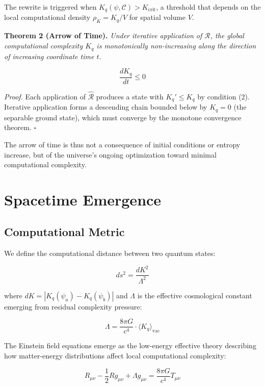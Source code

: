 \documentclass[12pt,a4paper]{article}
\begin{document}
The rewrite is triggered when $K_q(\psi, \mathcal{C}) > K_{\text{crit}}$, a threshold that depends on the local computational density $\rho_K = K_q / V$ for spatial volume $V$.

\textbf{Theorem 2 (Arrow of Time).} \textit{Under iterative application of $\hat{\mathcal{R}}$, the global computational complexity $K_q$ is monotonically non-increasing along the direction of increasing coordinate time $t$.}

\begin{equation}
\frac{dK_q}{dt} \leq 0
\label{eq:arrow}
\end{equation}

\textit{Proof.} Each application of $\hat{\mathcal{R}}$ produces a state with $K_q' \leq K_q$ by condition (2). Iterative application forms a descending chain bounded below by $K_q = 0$ (the separable ground state), which must converge by the monotone convergence theorem. $\square$

The arrow of time is thus not a consequence of initial conditions or entropy increase, but of the universe's ongoing optimization toward minimal computational complexity.

\section{Spacetime Emergence}

\subsection{Computational Metric}

We define the computational distance between two quantum states:

\begin{equation}
ds^2 = \frac{dK^2}{\Lambda^2}
\label{eq:metric}
\end{equation}

where $dK = |K_q(\psi_a) - K_q(\psi_b)|$ and $\Lambda$ is the effective cosmological constant emerging from residual complexity pressure:

\begin{equation}
\Lambda = \frac{8\pi G}{c^4} \cdot \langle K_q \rangle_{\text{vac}}
\end{equation}

The Einstein field equations emerge as the low-energy effective theory describing how matter-energy distributions affect local computational complexity:

\begin{equation}
R_{\mu\nu} - \frac{1}{2}Rg_{\mu\nu} + \Lambda g_{\mu\nu} = \frac{8\pi G}{c^4} T_{\mu\nu}
\end{equation}
\end{document}
